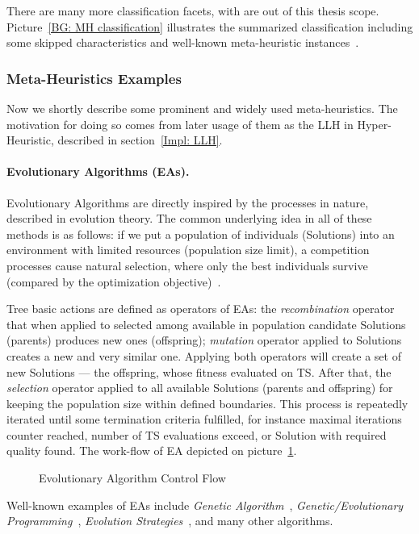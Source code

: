 There are many more classification facets, with are out of this thesis scope. Picture~\ref{BG: MH classification} illustrates the summarized classification including some skipped characteristics and well-known meta-heuristic instances~\cite{wiki_MH_classification}.


\subsubsection{Meta-Heuristics Examples}\label{BG: MH Examples}
Now we shortly describe some prominent and widely used meta-heuristics. The motivation for doing so comes from later usage of them as the LLH in Hyper-Heuristic, described in section~\ref{Impl: LLH}.

\paragraph{Evolutionary Algorithms (EAs).} Evolutionary Algorithms are directly inspired by the processes in nature, described in evolution theory. The common underlying idea in all of these methods is as follows: if we put a population of individuals (Solutions) into an environment with limited resources (population size limit), a competition processes cause natural selection, where only the best individuals survive (compared by the optimization objective)~\cite{eiben2015evolutionary}.

Tree basic actions are defined as operators of EAs: the \textit{recombination} operator that when applied to selected among available in population candidate Solutions (parents) produces new ones (offspring); \textit{mutation} operator applied to Solutions creates a new and very similar one. 
Applying both operators will create a set of new Solutions — the offspring, whose fitness evaluated on TS. After that, the \textit{selection} operator applied to all available Solutions (parents and offspring) for keeping the population size within defined boundaries. This process is repeatedly iterated until some termination criteria fulfilled, for instance maximal iterations counter reached, number of TS evaluations exceed, or Solution with required quality found. The work-flow of EA depicted on picture~\ref{bg:pic:EAs}.

\begin{figure}
	\centering
	
	\caption{Evolutionary Algorithm Control Flow}
	\label{bg:pic:EAs}
\end{figure}

Well-known examples of EAs include \textit{Genetic Algorithm}~\cite{sastry2005genetic}, \textit{Genetic/Evolutionary Programming}~\cite{koza1992evolution}, \textit{Evolution Strategies}~\cite{beyer2002evolution}, and many other algorithms.


